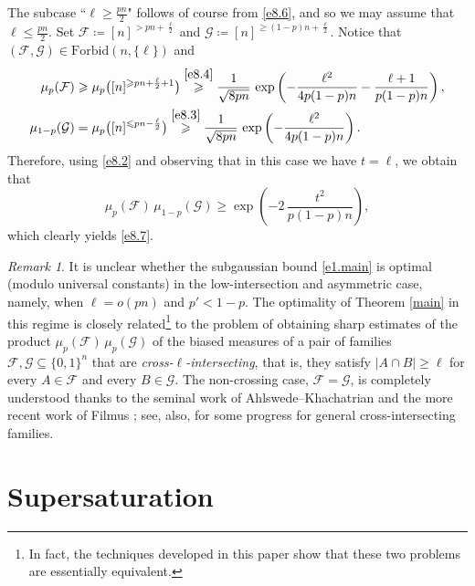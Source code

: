 \documentclass[10pt,a4paper]{amsart}
\theoremstyle{remark}
\newtheorem{rem}[thm]{Remark}
\newcommand{\meg}{\geqslant}
\newcommand{\mik}{\leqslant}
\newcommand{\Fcal}{\mathcal{F}}
\newcommand{\Gcal}{\mathcal{G}}
\begin{document}
The subcase ``$\ell\meg \frac{pn}{2}$" follows of course from \eqref{e8.6},
and so we may assume that $\ell\mik \frac{pn}{2}$. Set $\Fcal\coloneqq [n]^{>pn+\frac{\ell}{2}}$
and $\Gcal\coloneqq [n]^{\meg(1-p)n+\frac{\ell}{2}}$. Notice that $(\Fcal,\Gcal)\in\mathrm{Forbid}(n,\{\ell\})$ and
\begin{align}
\label{e8.8} \mu_{p}(\Fcal) & \meg \mu_p\big([n]^{\meg pn+\frac{\ell}{2}+1}\big) \stackrel{\eqref{e8.4}}{\meg}
\frac{1}{\sqrt{8pn}}\, \exp\left(-\frac{\ell^2}{4p(1-p)n}-\frac{\ell+1}{p(1-p)n}\right), \\
\label{e8.9} \mu_{1-p}(\Gcal) & = \mu_p\big([n]^{\mik pn-\frac{\ell}{2}}\big) \stackrel{\eqref{e8.3}}{\meg}
\frac{1}{\sqrt{8pn}}\, \exp\left(-\frac{\ell^2}{4p(1-p)n}\right).
\end{align}
Therefore, using \eqref{e8.2} and observing that in this case we have $t=\ell$, we obtain that
\begin{equation} \label{e8.10}
\mu_p(\Fcal)\, \mu_{1-p}(\Gcal)\meg \exp\left(-2\, \frac{t^2}{p(1-p)n}\right),
\end{equation}
which clearly yields \eqref{e8.7}.
\begin{rem} \label{r8.3}
It is unclear whether the subgaussian bound \eqref{e1.main} is optimal (modulo universal constants)
in the low-intersection and asymmetric case, namely, when $\ell=o(pn)$ and $p'<1-p$. The optimality of
Theorem \ref{main} in this regime is closely related\footnote{In fact, the techniques developed in this
paper show that these two problems are essentially equivalent.} to the problem of obtaining sharp estimates
of the product $\mu_p(\Fcal)\,\mu_p(\Gcal)$ of the biased measures of a pair of families
$\Fcal,\Gcal\subseteq \{0,1\}^n$ that are \emph{cross-$\ell$-intersecting}, that is, they satisfy
$|A\cap B|\meg\ell$ for every $A\in\Fcal$ and every $B\in\Gcal$. The non-crossing case, $\Fcal=\Gcal$,
is completely understood thanks to the seminal work of Ahlswede--Khachatrian \cite{AK97,AK99}
and the more recent work of Filmus \cite{Fi17}; see, also, \cite[Theorem 3.28]{Fi13} for some progress
for general cross-intersecting families.
\end{rem}


\section{Supersaturation} \label{sec9}

\end{document}
